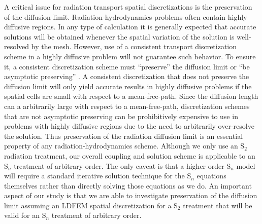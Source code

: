 \documentclass[preprint,12pt]{elsarticle}
\begin{document}
  
A critical issue for radiation transport spatial discretizations is the preservation of the diffusion limit.  
Radiation-hydrodynamics problems often contain highly diffusive regions.  In any type of calculation it is generally expected that 
accurate solutions will be obtained whenever the spatial variation of the solution is well-resolved by the mesh.  However, use of 
a consistent transport discretization scheme in a highly diffusive problem will not guarantee such behavior.  To ensure it, a consistent 
discretization scheme must ``preserve'' the diffusion limit or ``be asymptotic preserving'' \cite{larsenmorel}.  A consistent discretization 
that does not preserve the diffusion limit will only yield accurate results in highly diffusive problems if the spatial cells are small with 
respect to a mean-free-path.  Since the diffusion length can a arbitrarily large with respect to a mean-free-path, discretization schemes that 
are not asymptotic preserving can be prohibitively expensive to use in problems with highly diffusive regions due to the need to arbitrarily 
over-resolve the solution. Thus preservation of the radiation diffusion limit is an essential property of any radiation-hydrodynamics scheme.  
Although we only use an S$_2$ radiation treatment, our overall coupling and solution scheme is applicable to an S$_n$ treatment of arbitrary 
order.  The only caveat is that a higher order S$_n$ model will require a standard iterative solution technique for the S$_n$ equations themselves 
rather than directly solving those equations as we do. An 
important aspect of our study is that we are able to investigate preservation of the diffusion limit assuming an LDFEM spatial discretization 
for a S$_2$ treatment that will be valid for an S$_n$ treatment of arbitrary order.  
\end{document}
